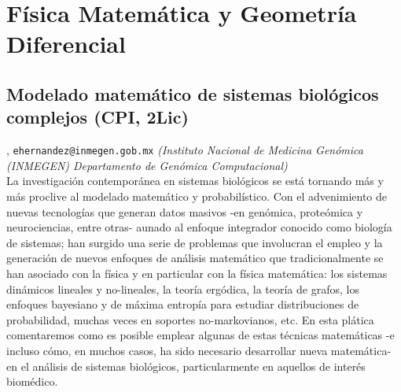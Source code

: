 \section{F\'isica Matem\'atica y Geometr\'ia Diferencial}

\subsection{\sffamily Modelado matem\'atico de sistemas biol\'ogicos complejos {\footnotesize (CPI, 2Lic)}} \label{reg-1514} 
, {\tt ehernandez@inmegen.gob.mx}  {\slshape (Instituto Nacional de Medicina Gen\'omica (INMEGEN) Departamento de Gen\'omica Computacional)}\\
          \noindent La investigaci\'on contempor\'anea en sistemas biol\'ogicos se est\'a tornando m\'as y m\'as proclive al modelado matem\'atico y probabil\'istico. Con el advenimiento de nuevas tecnolog\'ias que generan datos masivos -en gen\'omica, prote\'omica y neurociencias, entre otras- aunado al enfoque integrador conocido como biolog\'ia de sistemas; han surgido una serie de problemas que involucran el empleo y la generaci\'on de nuevos enfoques de an\'alisis matem\'atico que tradicionalmente se han asociado con la f\'isica y en particular con la f\'isica matem\'atica: los sistemas din\'amicos lineales y no-lineales, la teor\'ia erg\'odica, la teor\'ia de grafos, los enfoques bayesiano y de m\'axima entrop\'ia para estudiar distribuciones de probabilidad, muchas veces en soportes no-markovianos, etc. En esta pl\'atica comentaremos como es posible emplear algunas de estas t\'ecnicas matem\'aticas -e incluso c\'omo, en muchos casos, ha sido necesario desarrollar nueva matem\'atica- en el an\'alisis de sistemas biol\'ogicos, particularmente en aquellos de inter\'es biom\'edico.
